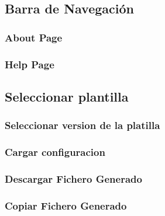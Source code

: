 \documentclass[12pt, a4paper, twoside]{article}
\begin{document}
\begin{umaappendices}
	\subsection{Barra de Navegación}
	\subsubsection{About Page}
	\subsubsection{Help Page}
	\subsection{Seleccionar plantilla}
	\subsubsection{Seleccionar version de la platilla}
	\subsubsection{Cargar configuracion}
	\subsubsection{Descargar Fichero Generado}
	\subsubsection{Copiar Fichero Generado}


\end{umaappendices}



\end{document}
